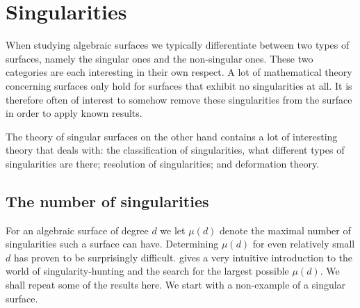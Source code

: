 \documentclass{article}
\begin{document}
    \section{Singularities}
    \label{sec:singularities}
     
    When studying algebraic surfaces we typically differentiate between two
    types of surfaces, namely the singular ones and the non-singular ones.
    These two categories are each interesting in their own respect. A lot of
    mathematical theory concerning surfaces only hold for surfaces that exhibit
    no singularities at all. It is therefore often of interest to somehow
    remove these singularities from the surface in order to apply known
    results.
    
    The theory of singular surfaces on the other hand contains a lot of
    interesting theory that deals with: the classification of singularities,
    what different types of singularities are there; resolution of
    singularities; and deformation theory.
    
    \subsection{The number of singularities}
    \label{sub:the_number_of_singularities}

    For an algebraic surface of degree $d$ we let
    $\mu(d)$ denote the maximal
    number of singularities such a surface can have.  Determining $\mu(d)$ for
    even relatively small $d$ has proven to be surprisingly difficult.
    \cite{Lab14} gives a very intuitive introduction to the world of
    singularity-hunting and the search for the largest possible $\mu(d)$. We
    shall repeat some of the results here. We start with a non-example of a
    singular surface.
    
\end{document}
